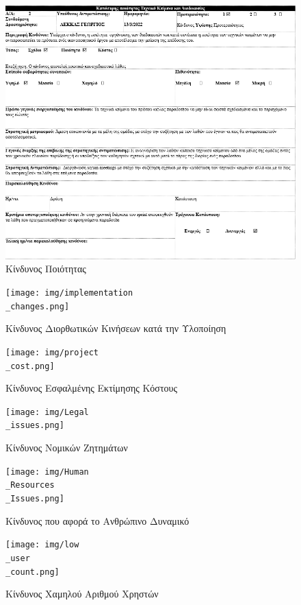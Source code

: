 \documentclass{../ol-softwaremanual}
\begin{document}
	\newpage
	
	
	
	\begin{figure}[htbp!]
		\includegraphics[scale=0.8]{img/bad quality.png}
		\caption{Κίνδυνος Ποιότητας}
	\end{figure}
	
	\newpage
	
	\begin{figure}[htbp!]
		\texttt{[image: img/implementation\\\_changes.png]}
		\caption{Κίνδυνος Διορθωτικών Κινήσεων κατά την Υλοποίηση}
	\end{figure}
	
	
	
	\newpage
	
	\begin{figure}[htbp!]
		\texttt{[image: img/project\\\_cost.png]}
		\caption{Κίνδυνος Εσφαλμένης Εκτίμησης Κόστους}
	\end{figure}
	
	\newpage
	
	\begin{figure}[htbp!]
		\texttt{[image: img/Legal\\\_issues.png]}
		\caption{Κίνδυνος Νομικών Ζητημάτων}
	\end{figure}
	
	
	\newpage
	
	\begin{figure}[htbp!]
		\texttt{[image: img/Human\\\_Resources\\\_Issues.png]}
		\caption{Kίνδυνος που αφορά το Ανθρώπινο Δυναμικό}
	\end{figure}

	\newpage

\begin{figure}[htbp!]
	\texttt{[image: img/low\\\_user\\\_count.png]}
	\caption{Kίνδυνος Χαμηλού Αριθμού Χρηστών}
\end{figure}
	
	
	
	
	
\end{document}
